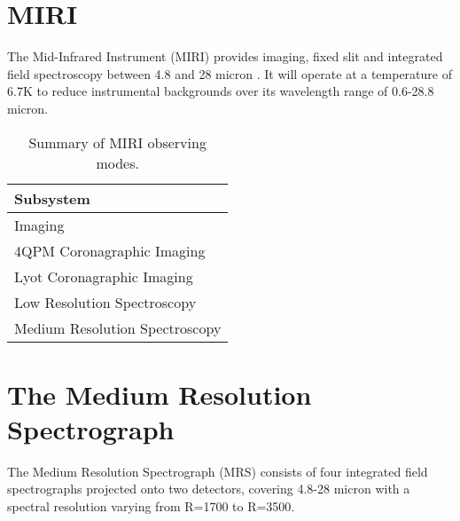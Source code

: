 \section{MIRI}
The Mid-Infrared Instrument (MIRI) provides imaging, fixed slit and integrated field spectroscopy between 4.8 and 28 micron \parencite{Rieke2015}.
It will operate at a temperature of 6.7K to reduce instrumental backgrounds over its wavelength range of 0.6-28.8 micron. %

\begin{table}[t]
	\begin{tabular}{l}
		\toprule
		\textbf{Subsystem}\\
		\midrule
		Imaging\\
		4QPM Coronagraphic Imaging\\
		Lyot Coronagraphic Imaging\\
		Low Resolution Spectroscopy\\
		Medium Resolution Spectroscopy\\
		\bottomrule
	\end{tabular}
	\caption{Summary of MIRI observing modes.}
	\label{tab:mirimodes}
\end{table}
\parencite{Kendrew2015} %
\section{The Medium Resolution Spectrograph}\label{sec:mrs}
The Medium Resolution Spectrograph (MRS) consists of four integrated field spectrographs projected onto two detectors, covering 4.8-28 micron with a spectral resolution varying from R=1700 to R=3500.

